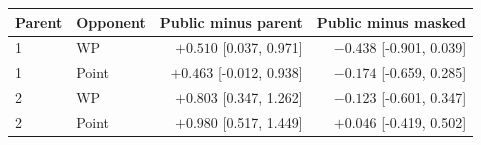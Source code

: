 \begin{tabular}{llrr}
\toprule
Parent & Opponent & Public minus parent & Public minus masked \\
\midrule
1 & WP & $+0.510$ [0.037, 0.971] & $-0.438$ [-0.901, 0.039] \\
1 & Point & $+0.463$ [-0.012, 0.938] & $-0.174$ [-0.659, 0.285] \\
2 & WP & $+0.803$ [0.347, 1.262] & $-0.123$ [-0.601, 0.347] \\
2 & Point & $+0.980$ [0.517, 1.449] & $+0.046$ [-0.419, 0.502] \\
\bottomrule
\end{tabular}
